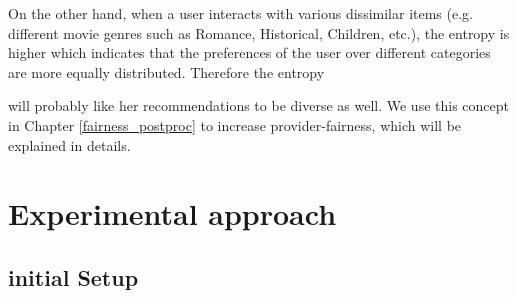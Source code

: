         
        On the other hand, when a user interacts with various dissimilar items (e.g. different movie genres such as Romance, Historical, Children, etc.), the entropy is higher which indicates that the preferences of the user over different categories are more equally distributed. Therefore the entropy
        
        will probably like her recommendations to be diverse as well. We use this concept in Chapter \ref{fairness_postproc} to increase provider-fairness, which will be explained in details.
        
        
        
    
    

        
        
            


\section{Experimental approach}
    
    \subsection{initial Setup}
    
